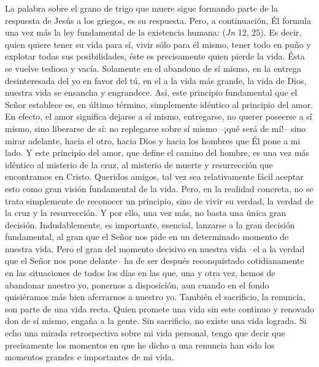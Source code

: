 \begin{body}
La palabra sobre el grano de trigo que muere sigue formando parte de la respuesta de Jesús a los griegos, es su respuesta. Pero, a continuación, Él formula una vez más la ley fundamental de la existencia humana:  (\textit{Jn} 12, 25). Es decir, quien quiere tener su vida para sí, vivir sólo para él mismo, tener todo en puño y explotar todas sus posibilidades, éste es precisamente quien pierde la vida. Ésta se vuelve tediosa y vacía. Solamente en el abandono de sí mismo, en la entrega desinteresada del yo en favor del tú, en el  a la vida más grande, la vida de Dios, nuestra vida se ensancha y engrandece. Así, este principio fundamental que el Señor establece es, en último término, simplemente idéntico al principio del amor. En efecto, el amor significa dejarse a sí mismo, entregarse, no querer poseerse a sí mismo, sino liberarse de sí: no replegarse sobre sí mismo –¡qué será de mí!– sino mirar adelante, hacia el otro, hacia Dios y hacia los hombres que Él pone a mi lado. Y este principio del amor, que define el camino del hombre, es una vez más idéntico al misterio de la cruz, al misterio de muerte y resurrección que encontramos en Cristo. Queridos amigos, tal vez sea relativamente fácil aceptar esto como gran visión fundamental de la vida. Pero, en la realidad concreta, no se trata simplemente de reconocer un principio, sino de vivir su verdad, la verdad de la cruz y la resurrección. Y por ello, una vez más, no basta una única gran decisión. Indudablemente, es importante, esencial, lanzarse a la gran decisión fundamental, al gran  que el Señor nos pide en un determinado momento de nuestra vida. Pero el gran  del momento decisivo en nuestra vida –el  a la verdad que el Señor nos pone delante– ha de ser después reconquistado cotidianamente en las situaciones de todos los días en las que, una y otra vez, hemos de abandonar nuestro yo, ponernos a disposición, aun cuando en el fondo quisiéramos más bien aferrarnos a nuestro yo. También el sacrificio, la renuncia, son parte de una vida recta. Quien promete una vida sin este continuo y renovado don de sí mismo, engaña a la gente. Sin sacrificio, no existe una vida lograda. Si echo una mirada retrospectiva sobre mi vida personal, tengo que decir que precisamente los momentos en que he dicho  a una renuncia han sido los momentos grandes e importantes de mi vida.


\end{body}

